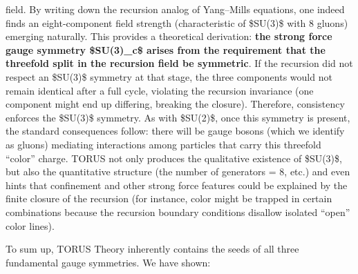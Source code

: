 \documentclass[
]{article}
\begin{document}
\begin{itemize}
  field\hspace{0pt}. By writing down the recursion analog of Yang--Mills
  equations, one indeed finds an eight-component field strength
  (characteristic of \$SU(3)\$ with 8 gluons) emerging
  naturally\hspace{0pt}. This provides a theoretical derivation:
  \textbf{the strong force gauge symmetry \$SU(3)\_c\$ arises from the
  requirement that the threefold split in the recursion field be
  symmetric}. If the recursion did not respect an \$SU(3)\$ symmetry at
  that stage, the three components would not remain identical after a
  full cycle, violating the recursion invariance (one component might
  end up differing, breaking the closure). Therefore, consistency
  enforces the \$SU(3)\$ symmetry\hspace{0pt}. As with \$SU(2)\$, once
  this symmetry is present, the standard consequences follow: there will
  be gauge bosons (which we identify as gluons) mediating interactions
  among particles that carry this threefold ``color'' charge. TORUS not
  only produces the qualitative existence of \$SU(3)\$, but also the
  quantitative structure (the number of generators = 8, etc.) and even
  hints that confinement and other strong force features could be
  explained by the finite closure of the recursion (for instance, color
  might be trapped in certain combinations because the recursion
  boundary conditions disallow isolated ``open'' color lines).
\end{itemize}

To sum up, TORUS Theory inherently contains the seeds of all three
fundamental gauge symmetries. We have shown:
\end{document}
